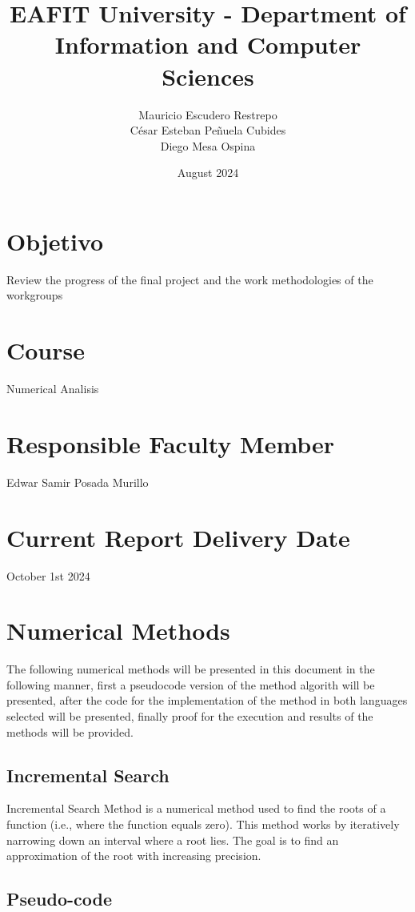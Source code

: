 \documentclass{article}
\title{EAFIT University - Department of Information and Computer Sciences}
\author{Mauricio Escudero Restrepo \\
        César Esteban Peñuela Cubides \\
        Diego Mesa Ospina}
\date{August 2024}
\begin{document}
\maketitle

\section{Objetivo}
Review the progress of the final project and the work methodologies of the workgroups

\section{Course}
Numerical Analisis

\section{Responsible Faculty Member}
Edwar Samir Posada Murillo

\section{Current Report Delivery Date}
October 1st 2024
    
\section[]{Numerical Methods}
    The following numerical methods will be presented in this document in the following manner, first a pseudocode 
    version of the method algorith will be presented, after the code for the implementation of the method in both 
    languages selected will be presented, finally proof for the execution and results of the methods will be provided.
    
    \subsection{Incremental Search}

    Incremental Search Method is a numerical method used to find the roots of a function
    (i.e., where the function equals zero).
    This method works by iteratively narrowing down an interval where a root
    lies.
    The goal is to find an approximation of the root with increasing precision.

    \subsection{Pseudo-code}
\end{document}
